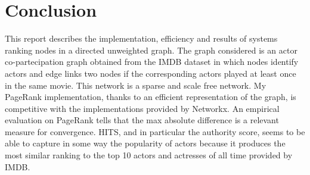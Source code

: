 \documentclass{article}
\begin{document}
\section*{Conclusion}
This report describes the implementation, efficiency and results of systems ranking nodes in a directed unweighted graph. The graph considered is an actor co-partecipation graph obtained from the IMDB dataset in which nodes identify actors and edge links two nodes if the corresponding actors played at least once in the same movie. This network is a sparse and scale free network. My PageRank implementation, thanks to an efficient representation of the graph, is competitive with the implementations provided by Networkx. An empirical evaluation on PageRank tells that the max absolute difference is a relevant measure for convergence. HITS, and in particular the authority score, seems to be able to capture in some way the popularity of actors because it produces the most similar ranking to the top 10 actors and actresses of all time provided by IMDB.

{}

\end{document}
